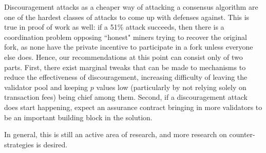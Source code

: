 \documentclass[12pt]{article}
\begin{document}
Discouragement attacks as a cheaper way of attacking a consensus algorithm are one of the hardest classes of attacks to come up with defenses against. This is true in proof of work as well: if a 51\% attack succeeds, then there is a coordination problem opposing ``honest" miners trying to recover the original fork, as none have the private incentive to participate in a fork unless everyone else does. Hence, our recommendations at this point can consist only of two parts. First, there exist marginal tweaks that can be made to mechanisms to reduce the effectiveness of discouragement, increasing difficulty of leaving the validator pool and keeping $p$ values low (particularly by not relying solely on transaction fees) being chief among them. Second, if a discouragement attack does start happening, expect an assurance contract bringing in more validators to be an important building block in the solution.

In general, this is still an active area of research, and more research on counter-strategies is desired.



\end{document}
